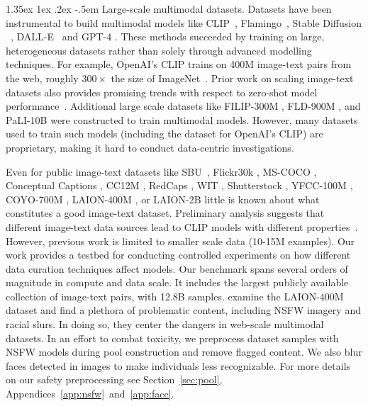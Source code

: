 \documentclass[dvipsnames,11pt]{article}
\makeatletter
\renewcommand\paragraph{\@startsection{paragraph}{4}{\z@}                                     {1.35ex \@plus1ex \@minus.2ex}                                {-.5em}
{\normalfont\normalsize\bfseries}}
\makeatother
\begin{document}
\paragraph{Large-scale multimodal datasets.} Datasets have been instrumental to build multimodal models like CLIP~\cite{radford2021learning}, Flamingo~\cite{alayrac2022flamingo}, Stable Diffusion ~\cite{rombach2022high}, DALL-E~\cite{ramesh2021zero,ramesh2022hierarchical} and GPT-4 \cite{gpt4}.
These methods succeeded by training on large, heterogeneous datasets rather than solely through advanced modelling techniques.
For example, OpenAI's CLIP trains on 400M image-text pairs from the web, roughly $300\times$ the size of ImageNet~\cite{deng2009imagenet}.
Prior work on scaling image-text datasets also provides promising trends with respect to zero-shot model performance~\cite{jia2021scaling,pham2021scaling}. 
Additional large scale datasets like FILIP-300M \cite{filip}, FLD-900M \cite{yuan2021florence}, and PaLI-10B \cite{chen2022pali} were constructed to train multimodal models.
However, many datasets used to train such models (including the dataset for OpenAI's CLIP) are proprietary, making it hard to conduct data-centric investigations.

Even for public image-text datasets like SBU~\cite{sbu}, Flickr30k \cite{flickr30k}, MS-COCO \cite{mscoco}, Conceptual Captions \cite{sharma2018conceptual}, CC12M \cite{changpinyo2021conceptual}, RedCaps \cite{desai2021redcaps}, WIT \cite{srinivasan2021wit}, Shutterstock \cite{nguyen2022quality}, YFCC-100M \cite{yfcc100m}, COYO-700M \cite{coyo700m}, LAION-400M \cite{laion400m}, or LAION-2B \cite{laion5b} little is known about what constitutes a good image-text dataset. Preliminary analysis suggests that different image-text data sources lead to CLIP models with different properties~\cite{nguyen2022quality}. However, previous work is limited to smaller scale data (10-15M examples). 
Our work provides a testbed for conducting controlled experiments on how different data curation techniques affect models. Our benchmark spans several orders of magnitude in compute and data scale. It includes the largest publicly available collection of image-text pairs, with 12.8B samples.
\citet{Birhane2021MultimodalDM} examine the LAION-400M dataset and find a plethora of problematic content, including NSFW imagery and racial slurs. In doing so, they center the dangers in web-scale multimodal datasets. In an effort to combat toxicity, we preprocess dataset samples with NSFW models during pool construction and remove flagged content. We also blur faces detected in images to make individuals less recognizable. For more details on our safety preprocessing see Section~\ref{sec:pool}, Appendices~\ref{app:nsfw}~and~\ref{app:face}.
\end{document}
